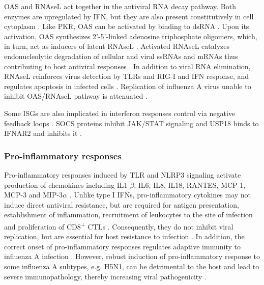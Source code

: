 		\gls{OAS} and \gls{RNAseL} act together in the antiviral RNA decay pathway. Both enzymes are upregulated by \gls{IFN}, but they are also present constitutively in cell cytoplasm \parencite{Sadler2008}. Like \gls{PKR}, \gls{OAS} can be activated by binding to dsRNA \parencite{Castelli1998}. Upon its activation, \gls{OAS} synthesizes 2'-5'-linked adenosine triphosphate oligomers, which, in turn, act as inducers of latent \gls{RNAseL} \parencite{Rebouillat1999}. Activated \gls{RNAseL} catalyzes endonucleolytic degradation of cellular and viral ssRNAs and mRNAs thus contributing to host antiviral responses \parencite{Dyer2006}. In addition to viral RNA elimination, \gls{RNAseL} reinforces virus detection by \gls{TLR}s and \gls{RIG-I} and \gls{IFN} response, and regulates apoptosis in infected cells \parencite{Liang2006}. Replication of influenza A virus unable to inhibit \gls{OAS}/\gls{RNAseL} pathway is attenuated \parencite{Min2006}.
		
		Some \gls{ISG}s are also implicated in interferon responses control via negative feedback loops \parencite{Schneider2014}. SOCS proteins inhibit JAK/STAT signaling \parencite{Hong2013} and USP18 binds to IFNAR2 and inhibits it \parencite{Ritchie2004}.
		

		
		
		\subsubsection{Pro-inflammatory responses}
		
		Pro-inflammatory responses induced by \gls{TLR} and \gls{NLRP3} signaling activate production of chemokines including IL1-$\beta$, IL6, IL8, IL18, RANTES, MCP-1, MCP-3 and MIP-3$\alpha$ \parencite{Julkunen2000, LeGoffic2007}. Unlike type I \glspl{IFN}, pro-inflammatory cytokines may not induce direct antiviral resistance, but are required for antigen presentation, establishment of inflammation,  recruitment of leukocytes to the site of infection and proliferation of CD8\textsuperscript{+} \glspl{CTL} \parencite{VanDerSluijs2005, Schulz2005, LeGoffic2006}. Consequently, they do not inhibit viral replication, but are essential for host resistance to infection \parencite{Pang2013}. In addition, the correct onset of pro-inflammatory responses regulates adaptive immunity to influenza A infection \parencite{Trinchieri2003, Ichinohe2009}. However, robust induction of pro-inflammatory response to some influenza A subtypes, e.g. H5N1, can be detrimental to the host and lead to severe immunopathology, thereby increasing viral pathogenicity \parencite{LaGruta2007}.	
			
